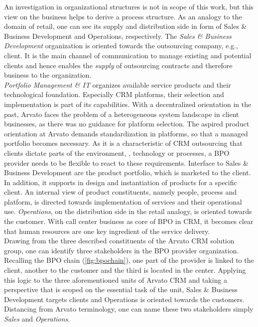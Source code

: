 An investigation in organizational structures is not in scope of this work, but this view on the business helps to derive a process structure. As an analogy to the domain of retail, one can see its supply and distribution side in form of Sales \& Business Development and Operations, respectively. The \textit{Sales \& Business Development }organization is oriented towards the outsourcing company, e.g., client. It is the main channel of communication to manage existing and potential clients and hence enables the \textit{supply} of outsourcing contracts and therefore business to the organization.\\
 \textit{Portfolio Management \& IT} organizes available service products and their technological foundation. Especially CRM platforms, their selection and implementation is part of its capabilities. With a decentralized orientation in the past, Arvato faces the problem of a heterogeneous system landscape in client businesses, as there was no guidance for platform selection. The aspired product orientation at Arvato demands standardization in platforms, so that a managed portfolio becomes necessary. As it is a characteristic of CRM outsourcing that clients dictate parts of the environment, \eg, technology or processes, a BPO provider needs to be flexible to react to these requirements. Interface to Sales \& Business Development are the product portfolio, which is marketed to the client. In addition, it supports in design and instantiation of products for a specific client. An internal view of product constituents, namely people, process and platform, is directed towards implementation of services and their operational use. 
  \textit{Operations}, on the distribution side in the retail analogy, is oriented towards the customer. With call center business as core of BPO in CRM, it becomes clear that human resources are one key ingredient of the service delivery.  \\
  
  Drawing from the three described constituents of the Arvato CRM solution group, one can identify three stakeholders in the BPO provider organization. Recalling the BPO chain (\Fig \ref{fig:bpochain}), one part of the provider is linked to the client, another to the customer and the third is located in the center. Applying this logic to the three aforementioned units of Arvato CRM and taking a perspective that is scoped on the essential task of the unit, Sales \& Business Development targets clients and Operations is oriented towards the customers. Distancing from Arvato terminology, one can name these two stakeholders simply \textit{Sales} and \textit{Operations}. \\
  
